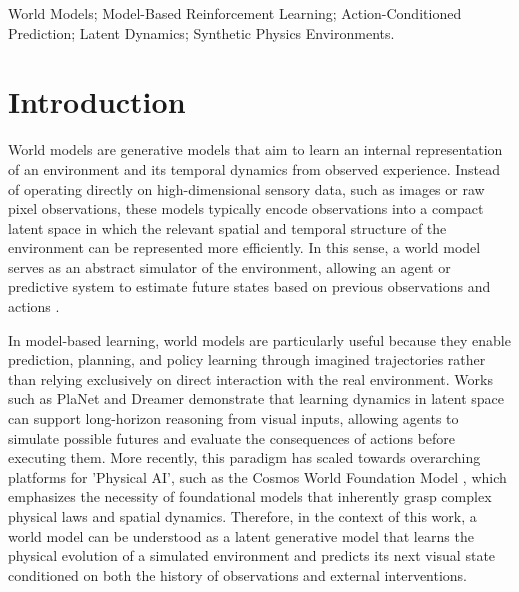\documentclass[conference]{IEEEtran}
\begin{document}
\begin{IEEEkeywords}
World Models; Model-Based Reinforcement Learning; Action-Conditioned Prediction; Latent Dynamics; Synthetic Physics Environments.
\end{IEEEkeywords}

\section{Introduction}
\label{sec:introduction}

World models are generative models that aim to learn an internal representation of an environment and its temporal dynamics from observed experience. Instead of operating directly on high-dimensional sensory data, such as images or raw pixel observations, these models typically encode observations into a compact latent space in which the relevant spatial and temporal structure of the environment can be represented more efficiently. In this sense, a world model serves as an abstract simulator of the environment, allowing an agent or predictive system to estimate future states based on previous observations and actions \cite{ha2018world, hafner2019learning}.

In model-based learning, world models are particularly useful because they enable prediction, planning, and policy learning through imagined trajectories rather than relying exclusively on direct interaction with the real environment. Works such as PlaNet \cite{hafner2019learning} and Dreamer \cite{hafner2020dream} demonstrate that learning dynamics in latent space can support long-horizon reasoning from visual inputs, allowing agents to simulate possible futures and evaluate the consequences of actions before executing them. More recently, this paradigm has scaled towards overarching platforms for 'Physical AI', such as the Cosmos World Foundation Model \cite{agarwal2025cosmos}, which emphasizes the necessity of foundational models that inherently grasp complex physical laws and spatial dynamics. Therefore, in the context of this work, a world model can be understood as a latent generative model that learns the physical evolution of a simulated environment and predicts its next visual state conditioned on both the history of observations and external interventions.
\end{document}

